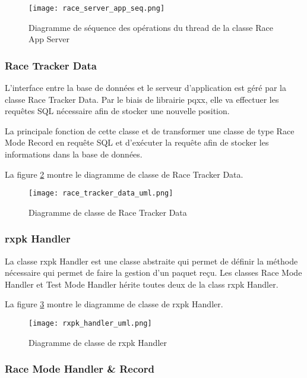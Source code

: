 \begin{figure}[htb]
\centering 
\texttt{[image: race\_server\_app\_seq.png]} 
\caption{Diagramme de séquence des opérations du thread de la classe Race App Server}
\label{fig:race_app_server_seq}
\end{figure}

\subsubsection{Race Tracker Data}

L'interface entre la base de données et le serveur d'application est géré par la classe Race Tracker Data. Par le biais de librairie pqxx, elle va effectuer les requêtes SQL nécessaire afin de stocker une nouvelle position.

La principale fonction de cette classe et de transformer une classe de type Race Mode Record en requête SQL et d'exécuter la requête afin de stocker les informations dans la base de données.

La figure \ref{fig:race_tracker_data_uml} montre le diagramme de classe de Race Tracker Data.

\begin{figure}[htb]
\centering 
\texttt{[image: race\_tracker\_data\_uml.png]} 
\caption{Diagramme de classe de Race Tracker Data}
\label{fig:race_tracker_data_uml}
\end{figure}

\subsubsection{rxpk Handler}

La classe rxpk Handler est une classe abstraite qui permet de définir la méthode nécessaire qui permet de faire la gestion d'un paquet reçu. Les classes Race Mode Handler et Test Mode Handler hérite toutes deux de la class rxpk Handler.

La figure \ref{fig:rxpk_handler_uml} montre le diagramme de classe de rxpk Handler.

\begin{figure}[htb]
\centering 
\texttt{[image: rxpk\_handler\_uml.png]} 
\caption{Diagramme de classe de rxpk Handler}
\label{fig:rxpk_handler_uml}
\end{figure}

\subsubsection{Race Mode Handler \& Record}


